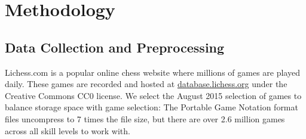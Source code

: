 \documentclass[conference]{IEEEtran}
\begin{document}
%
%
%

\section{Methodology}
\subsection{Data Collection and Preprocessing}
Lichess.com is a popular online chess website where millions of games are played daily. These games are recorded and hosted at \href{https://database.lichess.org/}{database.lichess.org} under the Creative Commons CC0 license. We select the August 2015 selection of games to balance storage space with game selection: The Portable Game Notation format files uncompress to 7 times the file size, but there are over 2.6 million games across all skill levels to work with.
\end{document}
